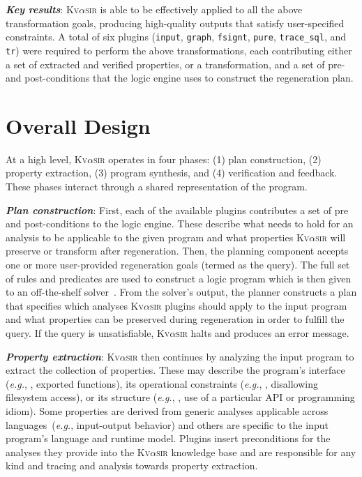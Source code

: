 \documentclass[nonacm,sigplan]{acmart}
\def\eg{{\em e.g.}, }
\newcommand{\sys}{{\scshape Kv{$\alpha$}sir}\xspace}
\newcommand{\heading}[1]{\vspace{2pt}\noindent\textbf{\emph{#1}}:\enspace}
\newcommand{\ttt}[1]{\texttt{#1}\xspace}
\begin{document}
\heading{Key results}
\sys is able to be effectively applied to all the above transformation goals,
producing high-quality outputs that satisfy user-specified constraints.
A total
of six plugins (\ttt{input}, \ttt{graph}, \ttt{fsignt}, \ttt{pure}, \ttt{trace\_sql}, and \ttt{tr})
were required to perform the above transformations, each
contributing either a set of extracted and verified properties, or a
transformation, and a set of pre- and post-conditions that the logic engine
uses to construct the regeneration plan.

\section{Overall Design}
\label{sec:design}

At a high level, \sys operates in four phases: (1) plan construction, (2)
property extraction, (3) program synthesis, and (4) verification and feedback.
These phases interact through a shared representation of the program.

\heading{Plan construction}
First, each of the available plugins contributes a set of pre and post-conditions 
to the logic engine.
These describe what needs to hold for an analysis to be applicable to the given 
program and what properties \sys will preserve or transform after regeneration.
Then, the planning component accepts one or more user-provided regeneration goals (termed as the query).
The full set of rules and predicates are used to construct a logic program
which is then given to an off-the-shelf solver~\cite{gebser2007clasp}.
From the solver's output, the planner constructs a plan that specifies which
analyses \sys plugins should apply to the input program and what properties can be
preserved during regeneration in order to fulfill the query.
If the query is unsatisfiable, \sys halts and produces an error message.

\heading{Property extraction} \sys then continues by analyzing the input program to
extract the collection of properties.
These may describe the program's interface
(\eg, exported functions), its operational constraints (\eg, disallowing
filesystem access), or its structure (\eg, use of a particular API or programming idiom).
Some properties are derived from generic analyses
applicable across languages~(\eg input-output behavior) 
and others are specific to the input program's language and runtime model.
Plugins insert preconditions for the analyses they provide into the \sys knowledge base
and are responsible 
for any kind and tracing and analysis towards property extraction.
\end{document}

